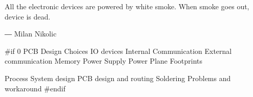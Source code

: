 All the electronic devices are powered by white smoke. When smoke goes out, device is dead.

― Milan Nikolic



 \label{fpga:section:initial_requirements}




 \label{fpga:section:cpu_architecture}

 \label{fpga:subsection:fitness_core}

 \label{fpga:subsection:selection_core}

 \label{fpga:subsection:crossover_core}

 \label{fpga:subsection:mutation_core}

#if 0
PCB
    Design Choices
        IO devices
        Internal Communication
        External communication
        Memory
    Power Supply
    Power Plane
    Footprints
        
    Process
        System design
        PCB design and routing
        Soldering
    Problems and workaround
#endif
